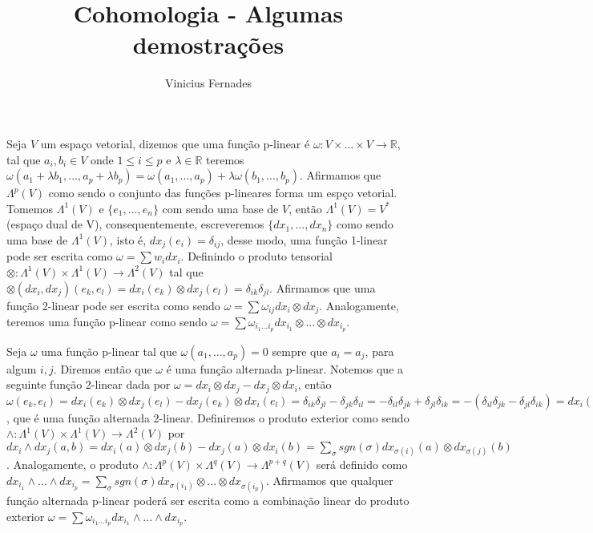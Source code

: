 \documentclass{article}
\begin{document}
	
	\title{Cohomologia - Algumas demostrações}
	\author{Vinicius Fernades}
	
	\maketitle
	Seja $V$ um espaço vetorial, dizemos que uma função p-linear é $\omega : V \times \dots \times V \to \mathbb{R}$, tal que $a_{i}, b_{i} \in V$ onde $1\leq i \leq p$ e $\lambda \in \mathbb{R}$ teremos $\omega(a_{1} + \lambda b_{1}, ..., a_{p} + \lambda b_{p}) = \omega(a_{1} , ..., a_{p} )+ \lambda \omega(b_{1}, ..., b_{p})$. Afirmamos que $\Lambda^{p}(V)$ como sendo o conjunto das funções p-lineares forma um espço vetorial. Tomemos $\Lambda^{1}(V)$ e $\{e_{1}, ..., e_{n}\}$ com sendo uma base de $V$, então $\Lambda^{1}(V) = V^{*}$ (espaço dual de V), consequentemente, escreveremos $\{dx_{1}, ..., dx_{n}\}$ como sendo uma base de $\Lambda^{1}(V)$, isto é, $dx_{j}(e_{i}) = \delta_{ij}$, desse modo, uma função 1-linear pode ser escrita como $\omega = \sum w_{i}dx_{i}$. Definindo o produto tensorial $\otimes: \Lambda^{1}(V) \times \Lambda^{1}(V) \to \Lambda^{2}(V)$ tal que $\otimes(dx_{i}, dx_{j})(e_{k}, e_{l}) = dx_{i}(e_{k}) \otimes dx_{j}(e_{l}) = \delta_{ik}\delta_{jl}$. Afirmamos que uma função 2-linear pode ser escrita como sendo $\omega = \sum \omega_{ij}dx_{i} \otimes dx_{j}$. Analogamente, teremos uma função p-linear como sendo  $\omega = \sum \omega_{i_{1}...i_{p}}dx_{i_{1}} \otimes ... \otimes dx_{i_{p}}$.
	
	Seja $\omega$ uma função p-linear tal que $\omega(a_{1}, ..., a_{p}) = 0 $ sempre que $a_{i} = a_{j}$, para algum $i, j$. Diremos então que $\omega$ é uma função alternada p-linear. Notemos que a seguinte função 2-linear dada por $\omega = dx_{i} \otimes dx_{j} - dx_{j} \otimes dx_{i}$, então $\omega(e_{k},e_{l}) = dx_{i}(e_{k}) \otimes dx_{j}(e_{l}) - dx_{j}(e_{k}) \otimes dx_{i}(e_{l}) = \delta_{ik}\delta_{jl} - \delta_{jk}\delta_{il} =  -\delta_{il}\delta_{jk} + \delta_{jl}\delta_{ik}= -(\delta_{il}\delta_{jk} - \delta_{jl}\delta_{ik}) = dx_{i}(e_{l}) \otimes dx_{j}(e_{k}) - dx_{j}(e_{l}) \otimes dx_{i}(e_{k}) = -\omega(e_{l}, e_{k})$, que é uma função alternada 2-linear. Definiremos o produto exterior como sendo $\wedge: \Lambda^{1}(V) \times \Lambda^{1}(V) \to \Lambda^{2}(V)$ por $ dx_{i} \wedge dx_{j}(a, b) = dx_{i}(a) \otimes dx_{j}(b) - dx_{j}(a) \otimes dx_{i}(b) = \sum_{\sigma} sgn(\sigma) dx_{\sigma(i)}(a) \otimes dx_{\sigma(j)}(b)$. Analogamente, o produto $\wedge: \Lambda^{p}(V) \times \Lambda^{q}(V) \to \Lambda^{p+q}(V)$ será definido como $dx_{i_{1}} \wedge ... \wedge dx_{i_{p}} = \sum_{\sigma}  sgn(\sigma) dx_{\sigma (i_{1})} \otimes ... \otimes dx_{\sigma (i_{p})}$. Afirmamos que qualquer função alternada p-linear poderá ser escrita como a combinação linear do produto exterior $\omega = \sum \omega_{i_{1}...i_{p}} dx_{i_{1}} \wedge... \wedge dx_{i_{p}}$.
	
\end{document}
